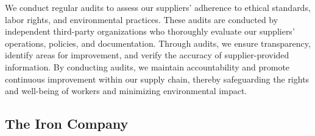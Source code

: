 \documentclass{article}
\begin{document}
We conduct regular audits to assess our suppliers' adherence to ethical standards, labor rights, and environmental practices. These audits are conducted by
independent third-party organizations who thoroughly evaluate our suppliers' operations, policies, and documentation. Through audits, we ensure transparency,
identify areas for improvement, and verify the accuracy of supplier-provided information. By conducting audits, we maintain accountability and promote continuous
improvement within our supply chain, thereby safeguarding the rights and well-being of workers and minimizing environmental impact.

\subsection{The Iron Company}
\end{document}
